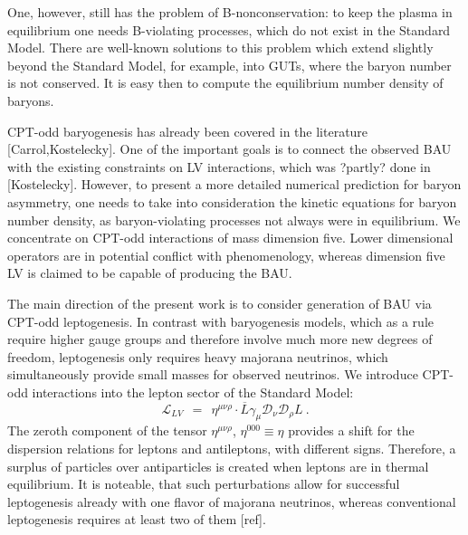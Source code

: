 \documentclass[12pt]{revtex4}
\newcommand{\md}{\mathcal{D}}
\newcommand{\ov}{\overline}
\begin{document}
	One, however, still has the problem of B-nonconservation: to keep the plasma
	in equilibrium one needs B-violating processes, which do not exist in the
	Standard Model.
	There are well-known solutions to this problem which extend slightly beyond
	the Standard Model, for example, into GUTs, where the baryon number is not
	conserved.
	It is easy then to compute the equilibrium number density of baryons.

	CPT-odd baryogenesis has already been covered in the literature [Carrol,Kostelecky].
	One of the important goals is to connect the observed BAU with the existing constraints
	on LV interactions, which was ?partly? done in [Kostelecky]. 
	However, to present a more detailed numerical prediction for baryon asymmetry, 
	one needs to take into consideration the kinetic equations for baryon number density,
	as baryon-violating processes not always were in equilibrium.
	We concentrate on CPT-odd interactions of mass dimension five.
	Lower dimensional operators are in potential conflict with phenomenology, whereas
	dimension five LV is claimed to be capable of producing the BAU.
	
	The main direction of the present work is to consider generation of BAU via CPT-odd
	leptogenesis.
	In contrast with baryogenesis models, which as a rule require higher gauge groups 
	and therefore involve much more new degrees of freedom, leptogenesis only
	requires heavy majorana neutrinos, which simultaneously provide small
	masses for observed neutrinos.
	We introduce CPT-odd interactions into the lepton sector of the Standard Model:
\begin{equation}
\label{LV}
	\mathcal{L}_{LV} ~~=~~ \eta^{\mu\nu\rho}\cdot \ov{L}\gamma_\mu \md_\nu \md_\rho L~.
\end{equation}
	The zeroth component of the tensor $ \eta^{\mu\nu\rho} $, $ \eta^{000} \equiv \eta $ provides a 
	shift for the dispersion relations for leptons and antileptons, with different signs. 
	Therefore, a surplus of particles over antiparticles is created when leptons are
	in thermal equilibrium.
	It is noteable, that such perturbations allow for successful leptogenesis already
	with one flavor of majorana neutrinos, whereas conventional leptogenesis requires
	at least two of them [ref].
	
\end{document}
